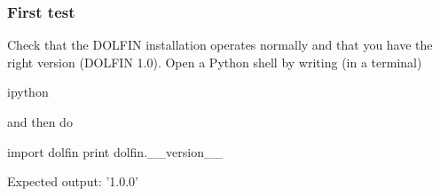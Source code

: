 \documentclass{fenicscourse}
\begin{document}
\begin{frame}[fragile]
\frametitle{First test}

Check that the DOLFIN installation operates normally and that you have
the right version (DOLFIN 1.0). Open a Python shell by writing (in a
terminal)
\vspace{-1em}
\begin{bash}
  ipython
\end{bash}
and then do
\vspace{-1em}
\begin{python}
import dolfin
print dolfin.__version__
\end{python}
Expected output: '1.0.0'

\end{frame}
\end{document}
